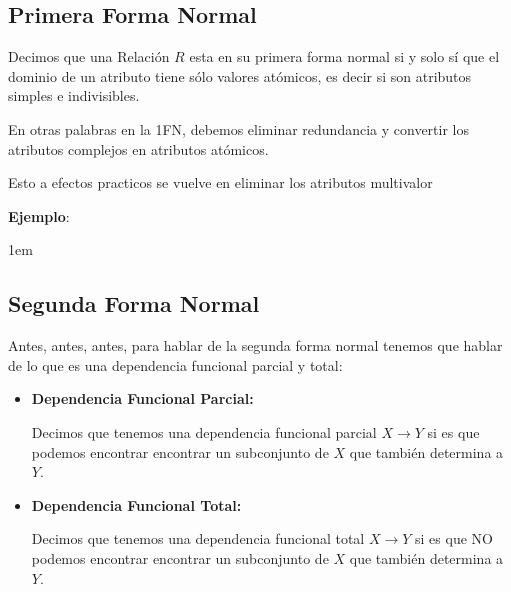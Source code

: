 \documentclass[12pt, fleqn]{report}                             %
\newenvironment{SmallIndentation}[1][0.75em]                    %
        {\begin{adjustwidth}{#1}{}\begin{footnotesize}}             %
        {\end{footnotesize}\end{adjustwidth}}                       %
\theoremstyle{break}                                            %
\newcommand \lLongTo {\longrightarrow}                          %
\begin{document}
            \clearpage
            \subsection{Primera Forma Normal}

                Decimos que una Relación $R$ esta en su primera forma normal
                si y solo sí que el dominio de un atributo tiene sólo
                valores atómicos, es decir si son atributos simples e indivisibles.

                En otras palabras en la 1FN, debemos eliminar redundancia
                y convertir los atributos complejos en atributos atómicos.

                Esto a efectos practicos se vuelve en eliminar los atributos multivalor

                \vspace{2em}
                \textbf{Ejemplo}:
                \begin{SmallIndentation}[1em]
                \end{SmallIndentation}


            \clearpage
            \subsection{Segunda Forma Normal}

                Antes, antes, antes, para hablar de la segunda forma normal tenemos que 
                hablar de lo que es una dependencia funcional parcial y total:

                \begin{itemize}
                    \item \textbf{Dependencia Funcional Parcial:}

                        Decimos que tenemos una dependencia funcional parcial $X \lLongTo Y$
                        si es que podemos encontrar encontrar un subconjunto de $X$ que también
                        determina a $Y$.

                    \item \textbf{Dependencia Funcional Total:}

                        Decimos que tenemos una dependencia funcional total $X \lLongTo Y$
                        si es que NO podemos encontrar encontrar un subconjunto de $X$ que también
                        determina a $Y$.
                \end{itemize}
\end{document}

